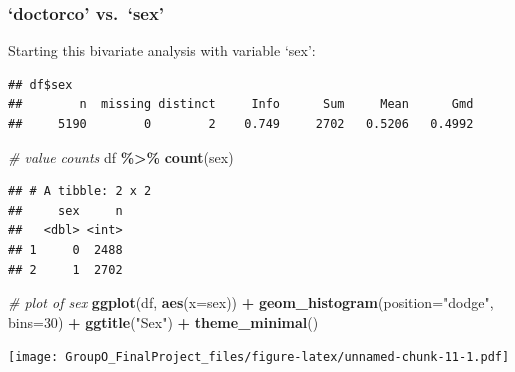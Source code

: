 \documentclass[
]{article}
\newenvironment{Shaded}{\begin{snugshade}}{\end{snugshade}}
\newcommand{\AttributeTok}[1]{\textcolor[rgb]{0.13,0.29,0.53}{#1}}
\newcommand{\CommentTok}[1]{\textcolor[rgb]{0.56,0.35,0.01}{\textit{#1}}}
\newcommand{\DecValTok}[1]{\textcolor[rgb]{0.00,0.00,0.81}{#1}}
\newcommand{\FunctionTok}[1]{\textcolor[rgb]{0.13,0.29,0.53}{\textbf{#1}}}
\newcommand{\NormalTok}[1]{#1}
\newcommand{\OtherTok}[1]{\textcolor[rgb]{0.56,0.35,0.01}{#1}}
\newcommand{\SpecialCharTok}[1]{\textcolor[rgb]{0.81,0.36,0.00}{\textbf{#1}}}
\newcommand{\StringTok}[1]{\textcolor[rgb]{0.31,0.60,0.02}{#1}}
\begin{document}
\subsubsection{`doctorco' vs.~`sex'}\label{doctorco-vs.-sex}

Starting this bivariate analysis with variable `sex':

\begin{Shaded}
\end{Shaded}

\begin{verbatim}
## df$sex 
##        n  missing distinct     Info      Sum     Mean      Gmd 
##     5190        0        2    0.749     2702   0.5206   0.4992
\end{verbatim}

\begin{Shaded}
\begin{Highlighting}[]
\CommentTok{\# value counts}
\NormalTok{df }\SpecialCharTok{\%\textgreater{}\%} \FunctionTok{count}\NormalTok{(sex)}
\end{Highlighting}
\end{Shaded}

\begin{verbatim}
## # A tibble: 2 x 2
##     sex     n
##   <dbl> <int>
## 1     0  2488
## 2     1  2702
\end{verbatim}

\begin{Shaded}
\begin{Highlighting}[]
\CommentTok{\# plot of sex}
\FunctionTok{ggplot}\NormalTok{(df, }\FunctionTok{aes}\NormalTok{(}\AttributeTok{x=}\NormalTok{sex)) }\SpecialCharTok{+}
  \FunctionTok{geom\_histogram}\NormalTok{(}\AttributeTok{position=}\StringTok{"dodge"}\NormalTok{, }\AttributeTok{bins=}\DecValTok{30}\NormalTok{) }\SpecialCharTok{+}
  \FunctionTok{ggtitle}\NormalTok{(}\StringTok{"Sex"}\NormalTok{) }\SpecialCharTok{+}
  \FunctionTok{theme\_minimal}\NormalTok{()}
\end{Highlighting}
\end{Shaded}

\texttt{[image: GroupO\_FinalProject\_files/figure-latex/unnamed-chunk-11-1.pdf]}

\begin{Shaded}
\end{Shaded}
\end{document}
